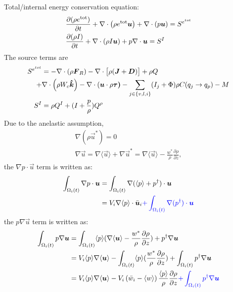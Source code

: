 \documentclass{report}
\begin{document}
\newpage
Total/internal energy conservation equation:
\begin{align*}
 & \diff{(\rho e^\mathrm{tot})}{t} + \divergence \left( \rho e^\mathrm{tot}\vec{u} \right) + \divergence \left( p\vec{u} \right)
 = S^{e^{tot}}\\
 & \diff{(\rho I)}{t} + \divergence \left(\rho I\vec{u} \right) + p\nabla\cdot \vec{u}
 = S^{I}
\end{align*}
The source terms are 
\begin{align*}
    S^{e^{tot}} &=  -\divergence (\rho \vec{F}_R) - \divergence \bigl[\rho (\vec{J} + \vec{D})\bigr] + \rho Q  \\
  +&\divergence \left(\rho W_c \vec{\hat k} \right)  - \divergence (\vec{u} \cdot \rho\vec{\tau)}
   - \sum_{j\in\{v,l,i\}}(I_j + \Phi)  \rho C(q_j \rightarrow q_p) - M\\
   S^{I} &= \rho Q^{I} + (I + \frac{p}{\rho})Q^{\rho}
\end{align*}
%
Due to the anelastic assumption, 
\begin{align*}
    \nabla (\rho \vec{u}^{*}) = 0\\
    \nabla \vec{u} = \nabla \langle\vec{u}\rangle + \nabla \vec{u}^* = \nabla \langle\vec{u}\rangle - \frac{w^{*}}{\rho}\frac{\partial \rho}{\partial z},
\end{align*} 
the $\nabla p \cdot \vec{u}$ term is written as:
\begin{align*}
    \int_{\Omega_i(t)} \nabla p \cdot \vec{u} &= \int_{\Omega_i(t)} \nabla(\langle p \rangle + p^{\dagger}) \cdot \vec{u}  \\
    & = V_i  \nabla\langle p \rangle  \cdot \bar{\vec{u}}_i  {\color{blue}+ \int_{\Omega_i(t)} \nabla(p^{\dagger}) \cdot \vec{u} } 
\end{align*}
the $p \nabla \vec{u}$ term is written as:
\begin{align*}
\int_{\Omega_i(t)} p \nabla\vec{u} &= 
    \int_{\Omega_i(t)} \langle p\rangle (\nabla \langle\vec{u}\rangle - \frac{w^{*}}{\rho}\frac{\partial \rho}{\partial z}) +  p^{\dagger}\nabla\vec{u}  \\
    &= V_i \langle p\rangle \nabla \langle\vec{u}\rangle   - \int_{\Omega_i(t)} \langle p\rangle  (  \frac{w^{*}}{\rho}\frac{\partial \rho}{\partial z}) + \int_{\Omega_i(t)}  p^{\dagger} \nabla \vec{u} \\
    &= V_i \langle p\rangle \nabla \langle\vec{u}\rangle -  V_i \left(\bar{w}_i - \langle w \rangle\right) \frac{\langle p\rangle}{\rho}\frac{\partial \rho}{\partial z} {\color{blue}+ \int_{\Omega_i(t)}  p^{\dagger} \nabla \vec{u}} \\
\end{align*}
\end{document}
